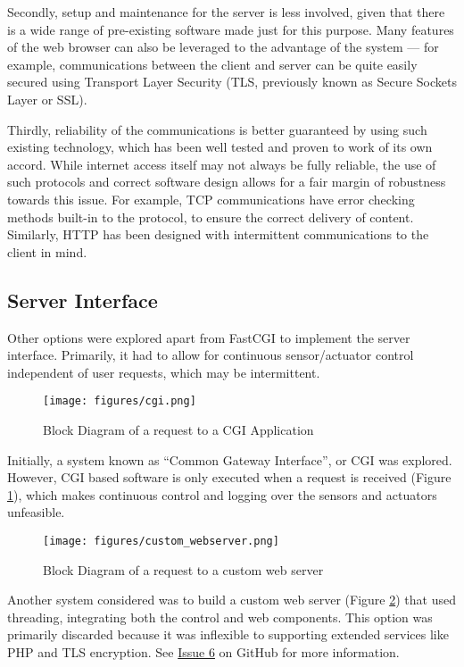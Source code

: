 Secondly, setup and maintenance for the server is less involved, given that there is a wide range of pre-existing software made just for this purpose. Many features of the web browser can also be leveraged to the advantage of the system --- for example, communications between the client and server can be quite easily secured using Transport Layer Security (TLS, previously known as Secure Sockets Layer or SSL).

Thirdly, reliability of the communications is better guaranteed by using such existing technology, which has been well tested and proven to work of its own accord. While internet access itself may not always be fully reliable, the use of such protocols and correct software design allows for a fair margin of robustness towards this issue. For example, TCP communications have error checking methods built-in to the protocol, to ensure the correct delivery of content. Similarly, HTTP has been designed with intermittent communications to the client in mind\cite{rfc2616}.

\subsection{Server Interface} \label{Server Interface}
Other options were explored apart from FastCGI to implement the server interface. Primarily, it had to allow for continuous sensor/actuator control independent of user requests, which may be intermittent.

\begin{figure}[H]
	\centering
	\texttt{[image: figures/cgi.png]}
	\caption{Block Diagram of a request to a CGI Application} 
	\label{cgi.png}
\end{figure}

Initially, a system known as ``Common Gateway Interface'', or CGI was explored. However, CGI based software is only executed when a request is received (Figure \ref{cgi.png}), which makes continuous control and logging over the sensors and actuators unfeasible. 

\begin{figure}[H]
	\centering
	\texttt{[image: figures/custom\_webserver.png]}
	\caption{Block Diagram of a request to a custom web server} 
	\label{custom_webserver.png}
\end{figure}

Another system considered was to build a custom web server (Figure \ref{custom_webserver.png}) that used threading, integrating both the control and web components. This option was primarily discarded because it was inflexible to supporting extended services like PHP and TLS encryption. See \href{https://github.com/szmoore/MCTX3420/issues/6}{Issue 6}\cite{github_issues} on GitHub for more information.


